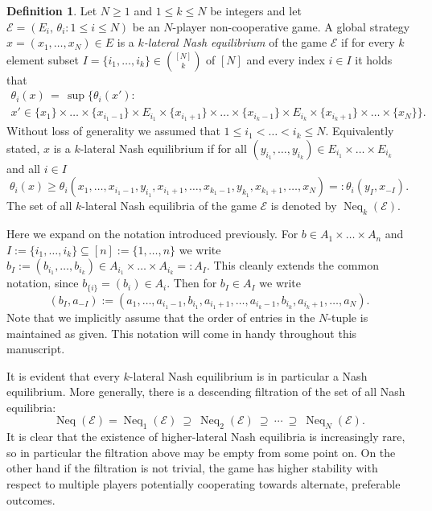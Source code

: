 \documentclass[a4paper,11pt,reqno,english]{amsart}
\theoremstyle{plain}
\theoremstyle{definition}
\newtheorem{definition}[theorem]{Definition}
\newcommand{\Ecal}{\mathcal{E}}
\DeclareMathOperator{\NashEquilibria}{Neq}
\begin{document}
\begin{definition}\label{def:multi_lateral_nash_equilibrium}
	Let $N\geq 1$ and $1\leq k\leq N$ be integers and let $\Ecal=(E_i,\,\theta_i : 1\leq i\leq N)$ be an $N$-player non-cooperative game.
	A global strategy $x=(x_1,\dots,x_N)\in E$ is a {\em $k$-lateral Nash equilibrium} of the game $\Ecal$ if for every $k$ element subset $I=\{i_1,\dots,i_k\}\in \binom{[N]}{k}$ of $[N]$ and every index $i\in I$ it holds that
	\begin{multline*}
		\theta_i(x) \, = \, \sup\big\{ \theta_i(x') : \\
		x'\in \{x_1\}\times \dots\times \{x_{i_1-1}\}\times E_{i_1}\times \{x_{i_1+1}\}\times\dots\times  \{x_{i_k-1}\}\times E_{i_k}\times \{x_{i_k+1}\}\times \dots\times \{x_N\}\big\}.
	\end{multline*}
	Without loss of generality we assumed that $1\leq i_1<\dots<i_k\leq N$.
	Equivalently stated, $x$ is a $k$-lateral Nash equilibrium if for all $(y_{i_1},\dots,y_{i_k})\in E_{i_1}\times\dots\times E_{i_k}$ and all $i\in I$
	\begin{displaymath}
		\theta_i(x) \geq \theta_i(x_1,\dots,x_{i_1-1},y_{i_1},x_{i_1+1},\dots,x_{k_1-1},y_{k_1},x_{k_1+1},\dots,x_N) =: \theta_i(y_I, x_{-I}).
	\end{displaymath}
	The set of all $k$-lateral Nash equilibria of the game $\Ecal$ is denoted by $\NashEquilibria_k(\Ecal)$.
\end{definition}

\medskip
Here we expand on the notation introduced previously.
For $b\in A_1\times\dots\times A_n$ and $I:=\{i_1,\dots,i_k\}\subseteq [n]:=\{1,\dots,n\}$ we write $b_I := (b_{i_1},\dots,b_{i_k}) \in A_{i_1}\times\dots\times A_{i_k} =: A_I$.
This cleanly extends the common notation, since $b_{\{i\}} = (b_i) \in A_i$. Then for $b_I\in A_I$ we write
\begin{displaymath}
	(b_I,a_{-I}):= (a_1,\dots,a_{i_1-1},b_{i_1},a_{i_1+1},\dots,a_{i_k-1},b_{i_k},a_{i_k+1},\dots,a_N).
\end{displaymath}
Note that we implicitly assume that the order of entries in the $N$-tuple is maintained as given. This notation will come in handy throughout this manuscript.



\medskip
It is evident that every $k$-lateral Nash equilibrium is in particular a Nash equilibrium.
More generally, there is a descending filtration of the set of all Nash equilibria:
\begin{equation}\label{eq:filtration}
	\NashEquilibria(\Ecal)=\NashEquilibria_1(\Ecal) \ \supseteq \ \NashEquilibria_2(\Ecal) \ \supseteq \  \cdots \ \supseteq \ \NashEquilibria_N(\Ecal).
\end{equation}
It is clear that the existence of higher-lateral Nash equilibria is increasingly rare, so in particular the filtration above may be empty from some point on. On the other hand if the filtration is not trivial, the game has higher stability with respect to multiple players potentially cooperating towards alternate, preferable outcomes.
\end{document}
